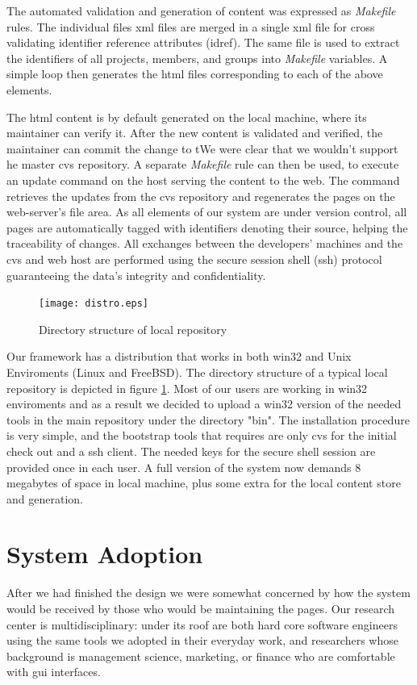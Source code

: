 \documentclass[10pt]{article}
\begin{document}
The automated validation and generation of content was
expressed as {\em Makefile} rules.
The individual files {\sc xml} files are merged in a
single {\sc xml} file for cross validating identifier
reference attributes ({\sc idref}).
The same file is used to extract the identifiers of
all projects, members, and groups into {\em Makefile}
variables.
A simple loop then generates the {\sc html} files
corresponding to each of the above elements.

The {\sc html} content is by default generated on the
local machine, where its maintainer can verify it.
After the new content is validated and verified,
the maintainer can commit the change to tWe were clear 
that we wouldn't support he master {\sc cvs} repository.
A separate {\em Makefile} rule can then be used,
to execute an update command on the
host serving the content to the web.
The command retrieves the updates from the {\sc cvs}
repository and regenerates the pages on the web-server's
file area.
As all elements of our system are under version control,
all pages are automatically tagged with identifiers
denoting their source, helping the traceability of changes.
All exchanges between the developers' machines and the
{\sc cvs} and web host are performed using the secure session
shell ({\sc ssh}) protocol guaranteeing the data's integrity
and confidentiality.

\begin{figure}
\texttt{[image: distro.eps]}
\caption{Directory structure of local repository}
\label{fig:eltrun-web-distro}
\end{figure}

Our framework has a distribution that works in both win32 and 
Unix Enviroments (Linux and FreeBSD). The directory structure of a typical local repository is depicted in
figure \ref{fig:eltrun-web-distro}.
Most of our users are working in win32 enviroments and as 
a result we decided to upload a win32 version of the needed tools 
in the main repository under the directory "bin". The installation procedure is very simple,
and the bootstrap tools that requires are only cvs for 
the initial check out and a ssh client. The needed keys 
for the secure shell session are provided once in each user. 
A full version of the system now demands 8 megabytes of space 
in local machine, plus some extra for the local content store and generation.

\section{System Adoption}
\label{sec:adopt}
After we had finished the design we were somewhat concerned
by how the system would be received by those who would be
maintaining the pages.
Our research center is multidisciplinary: under its roof
are both hard core software engineers using the same tools
we adopted in their everyday work, and researchers whose
background is management science, marketing, or finance
who are comfortable with {\sc gui} interfaces.
\end{document}
